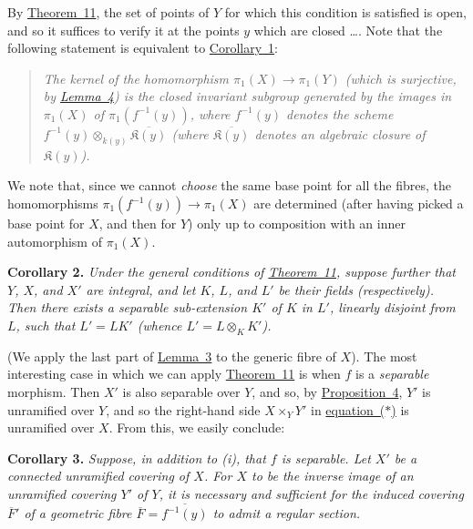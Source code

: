 \documentclass{article}
\newenvironment{itenv}[1]
  {\phantomsection\par\medskip\noindent\textbf{#1.}\itshape}
  {\medskip}
\newcommand{\kres}{\mathfrak{K}}
\begin{document}
By \hyperref[theorem11]{Theorem~11}, the set of points of $Y$ for which this condition is satisfied is open, and so it suffices to verify it at the points $y$ which are closed \ldots.
Note that the following statement is equivalent to \hyperref[theorem11corollary1]{Corollary~1}:
\begin{quote}
  \itshape
  The kernel of the homomorphism $\pi_1(X)\to\pi_1(Y)$ (which is surjective, by \hyperref[lemma4]{Lemma~4}) is the closed invariant subgroup generated by the images in $\pi_1(X)$ of $\pi_1(f^{-1}(y))$, where $f^{-1}(y)$ denotes the scheme $f^{-1}(y)\otimes_{k(y)}\overline{\kres(y)}$ (where $\overline{\kres(y)}$ denotes an algebraic closure of $\kres(y)$).
\end{quote}
We note that, since we cannot \emph{choose} the same base point for all the fibres, the homomorphisms $\pi_1(f^{-1}(y))\to\pi_1(X)$ are determined (after having picked a base point for $X$, and then for $Y$) only up to composition with an inner automorphism of $\pi_1(X)$.

\begin{itenv}{Corollary 2}
\label{theorem11corollary2}
  Under the general conditions of \hyperref[theorem11]{Theorem~11}, suppose further that $Y$, $X$, and $X'$ are integral, and let $K$, $L$, and $L'$ be their fields (respectively).
  Then there exists a separable sub-extension $K'$ of $K$ in $L'$, linearly disjoint from $L$, such that $L'=LK'$ (whence $L'=L\otimes_KK'$).
\end{itenv}

(We apply the last part of \hyperref[lemma3]{Lemma~3} to the generic fibre of $X$).
The most interesting case in which we can apply \hyperref[theorem11]{Theorem~11} is when $f$ is a \emph{separable} morphism.
Then $X'$ is also separable over $Y$, and so, by \hyperref[proposition4]{Proposition~4}, $Y'$ is unramified over $Y$, and so the right-hand side $X\times_YY'$ in \hyperref[equation*]{equation~($*$)} is unramified over $X$.
From this, we easily conclude:

\begin{itenv}{Corollary 3}
\label{theorem11corollary3}
  Suppose, in addition to (i), that $f$ is separable.
  Let $X'$ be a connected unramified covering of $X$.
  For $X$ to be the inverse image of an unramified covering $Y'$ of $Y$, it is necessary and sufficient for the induced covering $\overline{F}'$ of a geometric fibre $\overline{F}=\overline{f^{-1}(y)}$ to admit a regular section.
\end{itenv}
\end{document}
